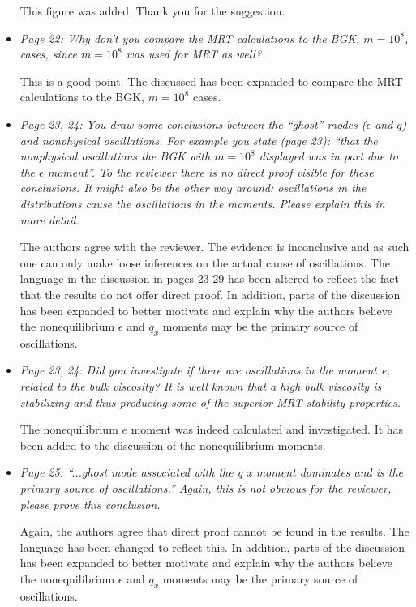 \documentclass{article}
\begin{document}
\begin{itemize}
	This figure was added.
	Thank you for the suggestion.
	
	\item \emph{Page 22: Why don’t you compare the MRT calculations to the BGK,
		$m=10^8$, cases, since $m=10^8$ was used for MRT as well?}
	
	This is a good point.
	The discussed has been expanded to compare the MRT calculations to the BGK, $m = 10^8$ cases.
	
	\item \emph{Page 23, 24: You draw some conclusions between the ``ghost'' modes ($\epsilon$ and $q$) and
		nonphysical oscillations. For example you state (page 23): ``that the nonphysical
		oscillations the BGK with $m = 10^8$ displayed was in part due to the $\epsilon$ moment''.
		To the reviewer there is no direct proof visible for these conclusions. It might also be
		the other way around; oscillations in the distributions cause the oscillations in the
		moments. Please explain this in more detail.}
		
	The authors agree with the reviewer.
	The evidence is inconclusive and as such one can only make loose inferences on the actual cause of oscillations.
	The language in the discussion in pages 23-29 has been altered to reflect the fact that the results do not offer direct proof.
	In addition, parts of the discussion has been expanded to better motivate and explain why the authors believe the nonequilibrium $\epsilon$ and $q_x$ moments may be the primary source of oscillations.
	
	\item \emph{Page 23, 24: Did you investigate if there are oscillations in the moment e, related to
		the bulk viscosity? It is well known that a high bulk viscosity is stabilizing and thus
		producing some of the superior MRT stability properties.}
	
	The nonequilibrium $e$ moment was indeed calculated and investigated.
	It has been added to the discussion of the nonequilibrium moments.
	
	\item \emph{Page 25: ``...ghost mode associated with the q x moment dominates and is the
		primary source of oscillations.'' Again, this is not obvious for the reviewer, please
		prove this conclusion.}
	
	Again, the authors agree that direct proof cannot be found in the results.
	The language has been changed to reflect this.
	In addition, parts of the discussion has been expanded to better motivate and explain why the authors believe the nonequilibrium $\epsilon$ and $q_x$ moments may be the primary source of oscillations.
	

\end{itemize}
\end{document}
